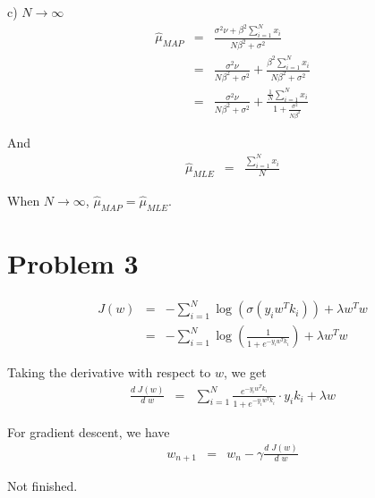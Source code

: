 \documentclass[12pt]{article}
\begin{document}
c) $N \rightarrow \infty$ \\
\begin{eqnarray*}
  \hat{\mu}_{MAP}
  &=& \frac{\sigma^2 \nu + \beta^2 \sum_{i=1}^N x_i} {N \beta^2 + \sigma^2} \\
  &=& \frac{\sigma^2 \nu} {N \beta^2 + \sigma^2}
  + \frac{\beta^2 \sum_{i=1}^N x_i} {N \beta^2 + \sigma^2} \\
  &=& \frac{\sigma^2 \nu} {N \beta^2 + \sigma^2}
  + \frac{\frac{1}{N} \sum_{i=1}^N x_i} {1 + \frac {\sigma^2}{N \beta^2} }
\end{eqnarray*}

And
\begin{eqnarray*}
  \hat {\mu}_{MLE} &=& \frac {\sum_{i=1}^N x_i}{N}
\end{eqnarray*}

When $N \rightarrow \infty$, $\hat{\mu}_{MAP} = \hat {\mu}_{MLE}$.

\section*{Problem 3}

\begin{eqnarray*}
  J(w)
  &=& - \sum_{i=1}^N \log(\sigma (y_i w^T k_i)) + \lambda w^T w \\
  &=& - \sum_{i=1}^N \log(\frac {1}{1 + e^{-y_i w^T k_i}}) + \lambda w^T w
\end{eqnarray*}

Taking the derivative with respect to $w$, we get
\begin{eqnarray*}
  \frac {d \; J(w)} {d \; w}
  &=& \sum_{i=1}^N \frac {e^{-y_i w^T k_i}}{1 + e^{-y_i w^T k_i}}
  \cdot y_i k_i + \lambda w
\end{eqnarray*}

For gradient descent, we have
\begin{eqnarray*}
  w_{n+1}
  &=& w_{n} - \gamma \frac {d \; J(w)} {d \; w}
\end{eqnarray*}

Not finished.
\end{document}
